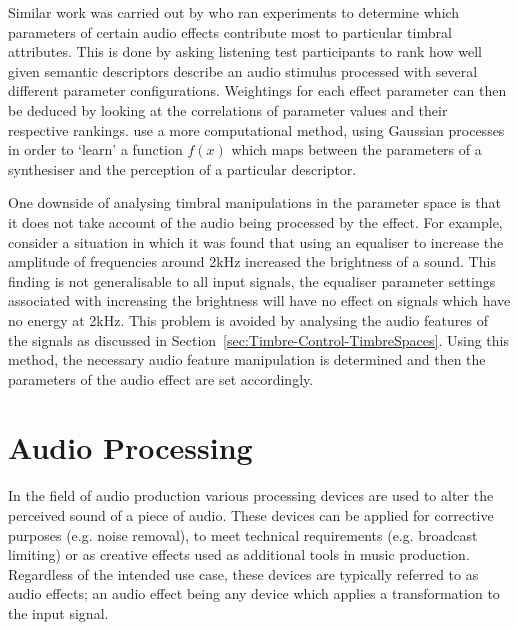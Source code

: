 		Similar work was carried out by \citet{sabin2011weighting} who ran experiments to determine which
		parameters of certain audio effects contribute most to particular timbral attributes. This is done by
		asking listening test participants to rank how well given semantic descriptors describe an audio stimulus
		processed with several different parameter configurations. Weightings for each effect parameter can then be
		deduced by looking at the correlations of parameter values and their respective rankings.
		\citet{huang2014active} use a more computational method, using Gaussian processes in order to `learn' a
		function $f(x)$ which maps between the parameters of a synthesiser and the perception of a particular
		descriptor.

		One downside of analysing timbral manipulations in the parameter space is that it does not take account of
		the audio being processed by the effect. For example, consider a situation in which it was found that using
		an equaliser to increase the amplitude of frequencies around 2kHz increased the brightness of a sound. This
		finding is not generalisable to all input signals, the equaliser parameter settings associated with
		increasing the brightness will have no effect on signals which have no energy at 2kHz. This problem is
		avoided by analysing the audio features of the signals as discussed in
		Section~\ref{sec:Timbre-Control-TimbreSpaces}. Using this method, the necessary audio feature manipulation
		is determined and then the parameters of the audio effect are set accordingly.

\section{Audio Processing}
\label{sec:Timbre-AudioProcessing}
	In the field of audio production various processing devices are used to alter the perceived sound of a piece of
	audio. These devices can be applied for corrective purposes (e.g. noise removal), to meet technical requirements
	(e.g. broadcast limiting) or as creative effects used as additional tools in music production. Regardless of the
	intended use case, these devices are typically referred to as audio effects; an audio effect being any device which
	applies a transformation to the input signal.
	
